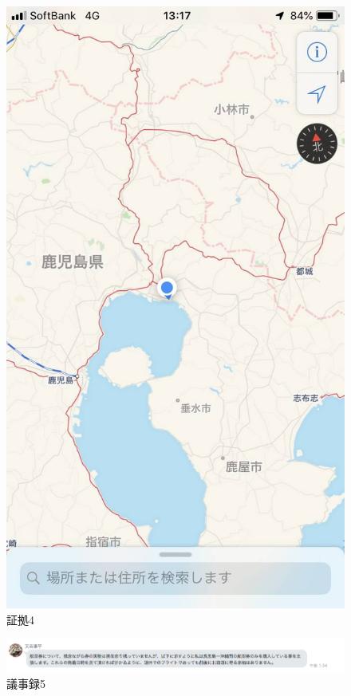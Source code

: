 \begin{figure}[H]
  \centering
  \includegraphics[clip,scale=0.2]{./section/Taira/figures/fig4}
  \caption{証拠4}
\label{fig4}
\end{figure}

\begin{figure}[H]
  \centering
  \includegraphics[clip,scale=0.5]{./section/Taira/figures/giji5}
  \caption{議事録5}
\label{giji5}
\end{figure}

